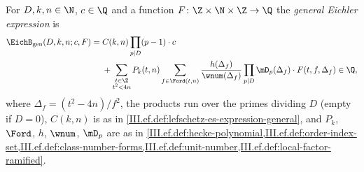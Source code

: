 For $D,k,n\in\N$, $c\in\Q$ and a function $F\colon\Z\times\N\times\Z\to\Q$ the \emph{general Eichler expression} is
\[
\begin{aligned}
  \EichB_{\mathrm{gen}}(D,k,n;c,F)={}&C(k,n)\prod_{p\mid D}(p-1)\cdot c\\
  &+\sum_{\substack{t\in\Z\\ t^2<4n}}P_k(t,n)\sum_{f\in\Ford(t,n)}\frac{h(\Delta_f)}{\wnum(\Delta_f)}\prod_{p\mid D}\mD_p(\Delta_f)\cdot F(t,f,\Delta_f)\in\Q,
\end{aligned}
\]
where $\Delta_f=(t^2-4n)/f^2$, the products run over the primes dividing $D$ (empty if $D=0$), $C(k,n)$ is as in
\cref{III.ef.def:lefschetz-es-expression-general}, and $P_k$, $\Ford$, $h$, $\wnum$, $\mD_p$ are as in
\cref{III.ef.def:hecke-polynomial,III.ef.def:order-index-set,III.ef.def:class-number-forms,III.ef.def:unit-number,III.ef.def:local-factor-ramified}.
